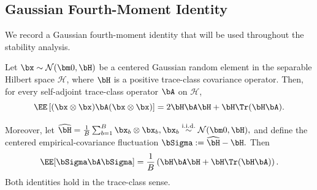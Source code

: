 \subsection{Gaussian Fourth-Moment Identity}
\label{app:subsec:gaussian-fourth-moment}

We record a Gaussian fourth-moment identity that will be used throughout the stability analysis.

\begin{lemma}
\label{app:lem:gaussian-fourth-moment}
Let $\bx\sim\mathcal N(\bm0,\bH)$ be a centered Gaussian random
element in the separable Hilbert space $\mathcal H$, where $\bH$ is a
positive trace-class covariance operator. Then, for every self-adjoint
trace-class operator $\bA$ on $\mathcal H$,
\begin{equation}
\label{app:eq:gaussian-fourth-moment}
\EE\left[
    (\bx\otimes\bx)\bA(\bx\otimes\bx)
\right]
=
2\bH\bA\bH
+
\bH\Tr(\bH\bA).
\end{equation}

Moreover, let
\(
\widehat{\bH}
=
\frac1B\sum_{b=1}^{B}\bx_b\otimes\bx_b,
\bx_b\overset{\mathrm{i.i.d.}}{\sim}\mathcal N(\bm0,\bH),
\)
and define the centered empirical-covariance fluctuation
\(
\bSigma
:=
\widehat{\bH}-\bH.
\)
Then
\begin{equation}
\label{app:eq:gaussian-empirical-covariance}
\EE[\bSigma\bA\bSigma]
=
\frac1B
\left(
    \bH\bA\bH
    +
    \bH\Tr(\bH\bA)
\right).
\end{equation}
Both identities hold in the trace-class sense.
\end{lemma}

